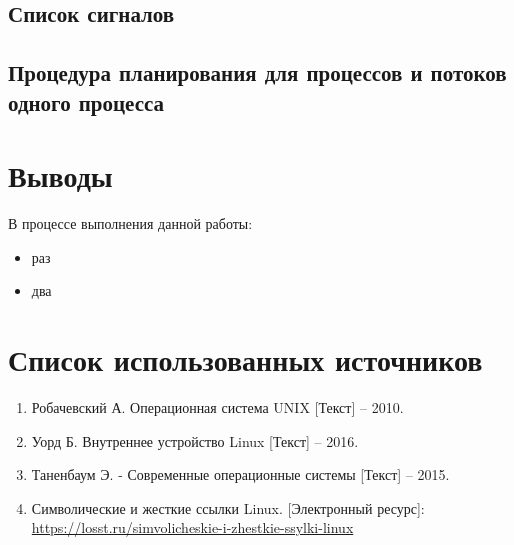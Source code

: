 \subsection{Список сигналов}

\subsection{Процедура планирования для процессов и потоков одного процесса}

\section{Выводы}

В процессе выполнения данной работы:
\begin{itemize}
	\item раз
	\item два
\end{itemize}

\section*{Список использованных источников}

\begin{enumerate}
	\item Робачевский А. Операционная система UNIX [Текст] -- 2010.
	\item Уорд Б. Внутреннее устройство Linux [Текст] -- 2016.
	\item Таненбаум Э. - Современные операционные системы [Текст] -- 2015.
	\item Символические и жесткие ссылки Linux. [Электронный ресурс]:\\
		\url{https://losst.ru/simvolicheskie-i-zhestkie-ssylki-linux}
\end{enumerate}


